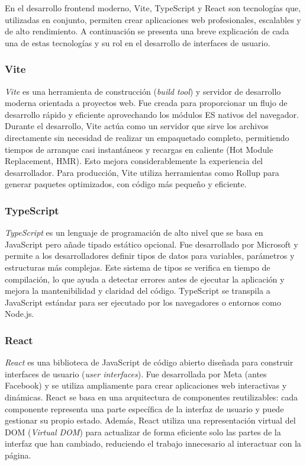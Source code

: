 \documentclass{article}
\begin{document}
En el desarrollo frontend moderno, Vite, TypeScript y React son tecnologías que, utilizadas en conjunto, permiten crear aplicaciones web profesionales, escalables y de alto rendimiento. A continuación se presenta una breve explicación de cada una de estas tecnologías y su rol en el desarrollo de interfaces de usuario.

\subsubsection*{Vite}

\textit{Vite}\cite{vite} es una herramienta de construcción (\textit{build tool}) y servidor de desarrollo moderna orientada a proyectos web. Fue creada para proporcionar un flujo de desarrollo rápido y eficiente aprovechando los módulos ES nativos del navegador. Durante el desarrollo, Vite actúa como un servidor que sirve los archivos directamente sin necesidad de realizar un empaquetado completo, permitiendo tiempos de arranque casi instantáneos y recargas en caliente (Hot Module Replacement, HMR). Esto mejora considerablemente la experiencia del desarrollador. Para producción, Vite utiliza herramientas como Rollup para generar paquetes optimizados, con código más pequeño y eficiente.

\subsubsection*{TypeScript}

\textit{TypeScript}\cite{typescript} es un lenguaje de programación de alto nivel que se basa en JavaScript pero añade tipado estático opcional. Fue desarrollado por Microsoft y permite a los desarrolladores definir tipos de datos para variables, parámetros y estructuras más complejas. Este sistema de tipos se verifica en tiempo de compilación, lo que ayuda a detectar errores antes de ejecutar la aplicación y mejora la mantenibilidad y claridad del código. TypeScript se transpila a JavaScript estándar para ser ejecutado por los navegadores o entornos como Node.js.

\subsubsection*{React}

\textit{React}\cite{react} es una biblioteca de JavaScript de código abierto diseñada para construir interfaces de usuario (\textit{user interfaces}). Fue desarrollada por Meta (antes Facebook) y se utiliza ampliamente para crear aplicaciones web interactivas y dinámicas. React se basa en una arquitectura de componentes reutilizables: cada componente representa una parte específica de la interfaz de usuario y puede gestionar su propio estado. Además, React utiliza una representación virtual del DOM (\textit{Virtual DOM}) para actualizar de forma eficiente solo las partes de la interfaz que han cambiado, reduciendo el trabajo innecesario al interactuar con la página.
\end{document}
